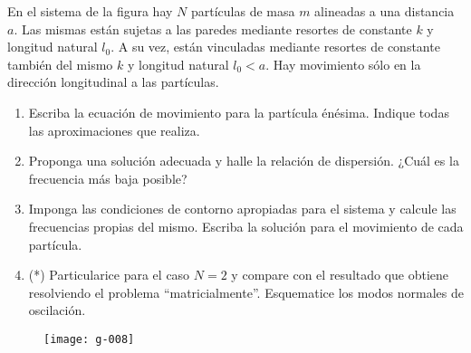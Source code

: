 \item
En el sistema de la figura hay \(N\) partículas de masa \(m\) alineadas a una distancia \(a\).
Las mismas están sujetas a las paredes mediante resortes de constante \(k\) y longitud natural \(l_0\).
A su vez, están vinculadas mediante resortes de constante también del mismo \(k\) y longitud natural \(l_0 < a\).
Hay movimiento sólo en la dirección longitudinal a las partículas.
\begin{enumerate}
	\item Escriba la ecuación de movimiento para la partícula énésima.
	Indique todas las aproximaciones que realiza.
	\item Proponga una solución adecuada y halle la relación de dispersión.
	¿Cuál es la frecuencia más baja posible?
	\item Imponga las condiciones de contorno apropiadas para el sistema y calcule las frecuencias propias del mismo.
	Escriba la solución para el movimiento de cada partícula.
	\item (*) Particularice para el caso \(N = 2\) y compare con el resultado que obtiene resolviendo el problema ``matricialmente''.
	Esquematice los modos normales de oscilación.	
\end{enumerate}
\begin{figure}[h]
	\centering
	\texttt{[image: g-008]}
\end{figure}



